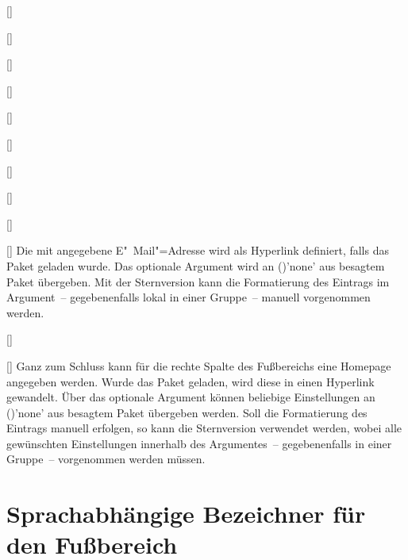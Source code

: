 \begin{Bundle*}[v2.05]{}
\begin{Declaration}{[]}
\begin{Declaration}{[]}
\begin{Declaration}{[]}
\begin{Declaration}{[]}
\begin{Declaration}{[]}
\begin{Declaration}{[]}
\begin{Declaration}{[]}
\begin{Declaration}{[]}
\begin{Declaration}{%
  []%
}
\begin{Declaration}{[]}
Die mit  angegebene E"~Mail"=Adresse wird als Hyperlink 
definiert, falls das Paket  geladen wurde. Das optionale 
Argument wird an ()'none' aus besagtem 
Paket übergeben. Mit der Sternversion  kann die 
Formatierung des Eintrags im Argument~-- gegebenenfalls lokal in einer 
Gruppe~-- manuell vorgenommen werden.
\end{Declaration}
\end{Declaration}
\end{Declaration}
\end{Declaration}
\end{Declaration}
\end{Declaration}
\end{Declaration}
\end{Declaration}
\end{Declaration}
\end{Declaration}

\begin{Declaration}{[]}
\begin{Declaration}{[]}
\printdeclarationlist%
%
Ganz zum Schluss kann für die rechte Spalte des Fußbereichs eine Homepage 
angegeben werden. Wurde das Paket  geladen, wird diese in 
einen Hyperlink gewandelt. Über das optionale Argument können beliebige 
Einstellungen an ()'none' aus besagtem 
Paket übergeben werden. Soll die Formatierung des Eintrags manuell erfolgen, so 
kann die Sternversion  verwendet werden, wobei alle gewünschten 
Einstellungen innerhalb des Argumentes~-- gegebenenfalls in einer Gruppe~-- 
vorgenommen werden müssen.
\end{Declaration}
\end{Declaration}


\section{Sprachabhängige Bezeichner für den Fußbereich}


\end{Bundle*}
